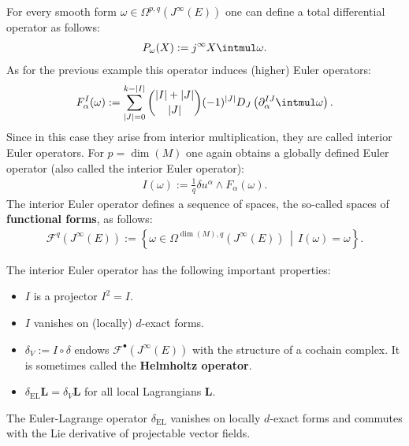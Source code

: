     \begin{example}
        For every smooth form $\omega\in\Omega^{p,q}(J^\infty(E))$ one can define a total differential operator as follows:
        \begin{gather}
            P_\omega(X) := j^\infty X\intmul\omega.
        \end{gather}
        As for the previous example this operator induces (higher) Euler operators:
        \begin{gather}
            \label{var:interior_euler_operators}
            F^I_\alpha(\omega) := \sum_{|J|=0}^{k-|I|}\binom{|I|+|J|}{|J|}(-1)^{|J|}D_J\left(\partial^{IJ}_\alpha\intmul\omega\right).
        \end{gather}
        Since in this case they arise from interior multiplication, they are called interior Euler operators. For $p=\dim(M)$ one again obtains a globally defined Euler operator (also called the interior Euler operator):
        \begin{gather}
            I(\omega) := \frac{1}{q}\delta u^\alpha\wedge F_\alpha(\omega).
        \end{gather}
        The interior Euler operator defines a sequence of spaces, the so-called spaces of \textbf{functional forms}, as follows:
        \begin{gather}
            \label{var:functional_complex}
            \mathcal{F}^q(J^\infty(E)) := \left\{\omega\in\Omega^{\dim(M),q}(J^\infty(E))\,\middle\vert\,I(\omega)=\omega\right\}.
        \end{gather}
    \end{example}
    \begin{property}\label{var:I_properties}
        The interior Euler operator has the following important properties:
        \begin{itemize}
            \item $I$ is a projector $I^2=I$.
            \item $I$ vanishes on (locally) $d$-exact forms.
            \item $\delta_V := I\circ\delta$ endows $\mathcal{F}^\bullet(J^\infty(E))$ with the structure of a cochain complex. It is sometimes called the \textbf{Helmholtz operator}.
            \item $\delta_\mathrm{EL}\mathbf{L} = \delta_V\mathbf{L}$ for all local Lagrangians $\mathbf{L}$.
        \end{itemize}
    \end{property}
    \begin{result}\label{var:EL_operator_properties}
        The Euler-Lagrange operator $\delta_\mathrm{EL}$ vanishes on locally $d$-exact forms and commutes with the Lie derivative of projectable vector fields.
    \end{result}

